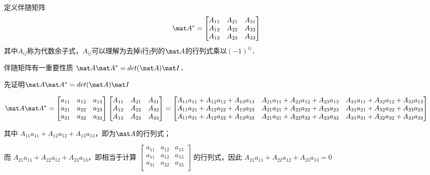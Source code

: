 定义伴随矩阵
\begin{equation}
\mat A^*=
\begin{bmatrix}
A_{11}&A_{21}&A_{31}\\
A_{12}&A_{22}&A_{32}\\
A_{13}&A_{23}&A_{33}\\
\end{bmatrix}
\end{equation}
其中$A_{ij}$称为代数余子式，$A_{ij}$可以理解为去掉i行j列的$\mat A$的行列式乘以$(-1)^{ij}$．

伴随矩阵有一重要性质 $\mat A \mat A^* = det(\mat A)\mat I$．

先证明$\mat A \mat A^* = det(\mat A)\mat I$

\begin{equation}
\mat A \mat A^* =
\begin{bmatrix}
a_{11}&a_{12}&a_{13}\\
a_{21}&a_{22}&a_{23}\\
a_{31}&a_{32}&a_{33}\\
\end{bmatrix}
\begin{bmatrix}
A_{11}&A_{21}&A_{31}\\
A_{12}&A_{22}&A_{32}\\
A_{13}&A_{23}&A_{33}\\
\end{bmatrix}
=
\begin{bmatrix}
A_{11}a_{11}+A_{12}a_{12}+A_{13}a_{13}&A_{21}a_{11}+A_{22}a_{12}+A_{23}a_{13}&A_{31}a_{11}+A_{32}a_{12}+A_{33}a_{13}\\
A_{11}a_{21}+A_{12}a_{22}+A_{13}a_{23}&A_{21}a_{21}+A_{22}a_{22}+A_{23}a_{23}&A_{31}a_{21}+A_{32}a_{22}+A_{33}a_{23}\\
A_{11}a_{31}+A_{12}a_{32}+A_{13}a_{33}&A_{21}a_{31}+A_{22}a_{32}+A_{23}a_{33}&A_{31}a_{31}+A_{32}a_{32}+A_{33}a_{33}\\
\end{bmatrix}
\end{equation}

其中
$
A_{11}a_{11}+A_{12}a_{12}+A_{13}a_{13}
$，即为$\mat A$的行列式；

而
$
A_{21}a_{11}+A_{22}a_{12}+A_{23}a_{13}
$，即相当于计算
$
\begin{bmatrix}
a_{11}&a_{12}&a_{13}\\
a_{11}&a_{12}&a_{13}\\
a_{31}&a_{32}&a_{33}\\
\end{bmatrix}
$
的行列式，因此
$
A_{21}a_{11}+A_{22}a_{12}+A_{23}a_{13}=0
$

